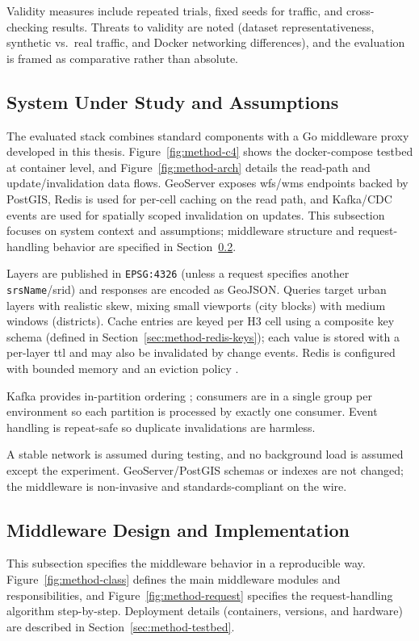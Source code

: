 Validity measures include repeated trials, fixed seeds for traffic, and cross-checking results. Threats to validity are noted (dataset representativeness, synthetic vs.\ real traffic, and Docker networking differences), and the evaluation is framed as comparative rather than absolute.

\subsection{System Under Study and Assumptions}
The evaluated stack combines standard components with a Go middleware proxy developed in this thesis. Figure~\ref{fig:method-c4} shows the docker-compose testbed at container level, and Figure~\ref{fig:method-arch} details the read-path and update/invalidation data flows. GeoServer exposes \ac{wfs}/\ac{wms} endpoints backed by PostGIS, Redis is used for per-cell caching on the read path, and Kafka/CDC events are used for spatially scoped invalidation on updates. This subsection focuses on system context and assumptions; middleware structure and request-handling behavior are specified in Section~\ref{sec:method-middleware}.

Layers are published in \texttt{EPSG:4326} (unless a request specifies another \texttt{srsName}/\ac{srid}) and responses are encoded as GeoJSON. Queries target urban layers with realistic skew, mixing small viewports (city blocks) with medium windows (districts). Cache entries are keyed per H3 cell using a composite key schema (defined in Section~\ref{sec:method-redis-keys}); each value is stored with a per-layer \ac{ttl} and may also be invalidated by change events. Redis is configured with bounded memory and an eviction policy \cite{Redis_Eviction}.

Kafka provides in-partition ordering \cite{Kafka_Introduction}; consumers are in a single group per environment so each partition is processed by exactly one consumer. Event handling is repeat-safe so duplicate invalidations are harmless.

A stable network is assumed during testing, and no background load is assumed except the experiment. GeoServer/PostGIS schemas or indexes are not changed; the middleware is non-invasive and standards-compliant on the wire.

\subsection{Middleware Design and Implementation}
\label{sec:method-middleware}
This subsection specifies the middleware behavior in a reproducible way. Figure~\ref{fig:method-class} defines the main middleware modules and responsibilities, and Figure~\ref{fig:method-request} specifies the request-handling algorithm step-by-step. Deployment details (containers, versions, and hardware) are described in Section~\ref{sec:method-testbed}.

